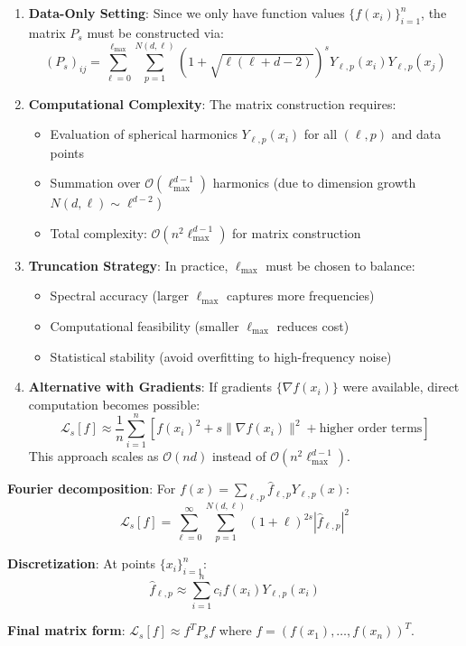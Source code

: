 \documentclass[a4paper]{article}
\begin{document}
\begin{enumerate}
\item \textbf{Data-Only Setting}: Since we only have function values $\{f(x_i)\}_{i=1}^n$, the matrix $P_s$ must be constructed via:
\[ (P_s)_{ij} = \sum_{\ell=0}^{\ell_{\max}} \sum_{p=1}^{N(d,\ell)} (1 + \sqrt{\ell(\ell + d - 2)})^s Y_{\ell,p}(x_i) Y_{\ell,p}(x_j) \]

\item \textbf{Computational Complexity}: The matrix construction requires:
\begin{itemize}
\item Evaluation of spherical harmonics $Y_{\ell,p}(x_i)$ for all $(\ell,p)$ and data points
\item Summation over $\mathcal{O}(\ell_{\max}^{d-1})$ harmonics (due to dimension growth $N(d,\ell) \sim \ell^{d-2}$)
\item Total complexity: $\mathcal{O}(n^2 \ell_{\max}^{d-1})$ for matrix construction
\end{itemize}

\item \textbf{Truncation Strategy}: In practice, $\ell_{\max}$ must be chosen to balance:
\begin{itemize}
\item Spectral accuracy (larger $\ell_{\max}$ captures more frequencies)
\item Computational feasibility (smaller $\ell_{\max}$ reduces cost)
\item Statistical stability (avoid overfitting to high-frequency noise)
\end{itemize}

\item \textbf{Alternative with Gradients}: If gradients $\{\nabla f(x_i)\}$ were available, direct computation becomes possible:
\[ \mathcal{L}_s[f] \approx \frac{1}{n}\sum_{i=1}^n \left[ f(x_i)^2 + s \|\nabla f(x_i)\|^2 + \text{higher order terms} \right] \]
This approach scales as $\mathcal{O}(nd)$ instead of $\mathcal{O}(n^2\ell_{\max}^{d-1})$.
\end{enumerate}

\textbf{Fourier decomposition}: For $f(x) = \sum_{\ell,p} \hat{f}_{\ell,p} Y_{\ell,p}(x)$:
\[ \mathcal{L}_s[f] = \sum_{\ell=0}^{\infty} \sum_{p=1}^{N(d,\ell)} (1+\ell)^{2s} |\hat{f}_{\ell,p}|^2 \]

\textbf{Discretization}: At points $\{x_i\}_{i=1}^n$:
\[ \hat{f}_{\ell,p} \approx \sum_{i=1}^n c_i f(x_i) Y_{\ell,p}(x_i) \]

\textbf{Final matrix form}: $\mathcal{L}_s[f] \approx f^T P_s f$ where $f = (f(x_1), \ldots, f(x_n))^T$.
\end{document}
